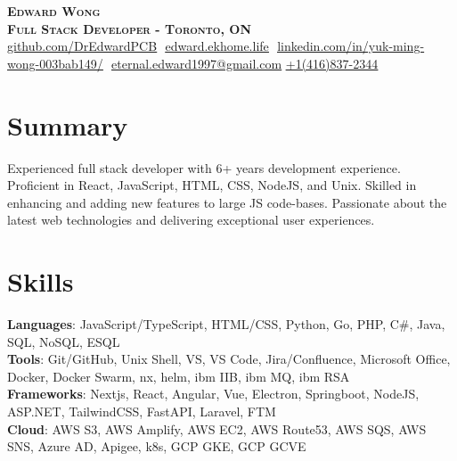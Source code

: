 \documentclass[letterpaper,11pt]{article}
\begin{document}

\vspace*{10pt}

\begin{center}
    \textbf{\Huge \scshape Edward Wong} \\ \vspace{8pt}
      \textbf{\small \scshape Full Stack Developer - Toronto, ON} \\ \vspace{8pt}
    \small 
    \href{https://github.com/DrEdwardPCB}{\underline{github.com/DrEdwardPCB}} $  $
    \href{https://edward.ekhome.life}
    {\underline{edward.ekhome.life}} $  $
    \href{https://www.linkedin.com/in/yuk-ming-wong-003bab149/}{\underline{linkedin.com/in/yuk-ming-wong-003bab149/}} $  $\newline
    \href{mailto:eternal.edward1997@gmail.com}
    {\underline{eternal.edward1997@gmail.com}}$  $
    \href{tel:+14168372344}
    {\underline{+1(416)837-2344}}
\end{center}
\section{Summary}
  {\small{Experienced full stack developer with 6+ years development experience. Proficient in React, JavaScript, HTML, CSS, NodeJS, and Unix. Skilled in enhancing and adding new features to large JS code-bases. Passionate about the latest web technologies and delivering exceptional user experiences.}}
  
\section{Skills}
 \begin{itemize}[leftmargin=0.15in, label={}]
    \small{\item{
    
     \textbf{Languages}{: JavaScript/TypeScript, HTML/CSS, Python, Go, PHP, C\#, Java, SQL, NoSQL, ESQL} \\
     
     \textbf{Tools}{: Git/GitHub, Unix Shell, VS, VS Code, Jira/Confluence, Microsoft Office, Docker, Docker Swarm, nx, helm, ibm IIB, ibm MQ, ibm RSA}\\
     
    \textbf{Frameworks}{: Nextjs, React, Angular, Vue, Electron, Springboot, NodeJS, ASP.NET, TailwindCSS, FastAPI, Laravel, FTM}\\
    \textbf{Cloud}{: AWS S3, AWS Amplify, AWS EC2, AWS Route53, AWS SQS, AWS SNS, Azure AD, Apigee, k8s, GCP GKE, GCP GCVE}
     
    }}
 \end{itemize}
 
\end{document}
